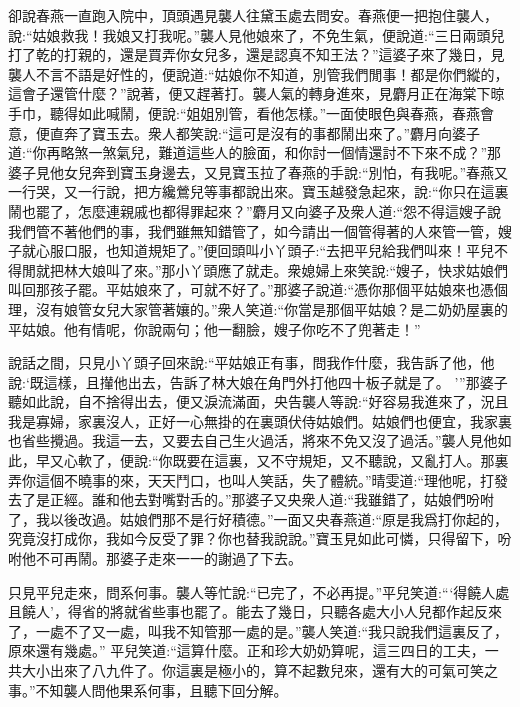 \begin{parag}
    卻說春燕一直跑入院中，頂頭遇見襲人往黛玉處去問安。春燕便一把抱住襲人，說:“姑娘救我！我娘又打我呢。”襲人見他娘來了，不免生氣，便說道:“三日兩頭兒打了乾的打親的，還是買弄你女兒多，還是認真不知王法？”這婆子來了幾日，見襲人不言不語是好性的，便說道:“姑娘你不知道，別管我們閒事！都是你們縱的，這會子還管什麼？”說著，便又趕著打。襲人氣的轉身進來，見麝月正在海棠下晾手巾，聽得如此喊鬧，便說:“姐姐別管，看他怎樣。”一面使眼色與春燕，春燕會意，便直奔了寶玉去。衆人都笑說:“這可是沒有的事都鬧出來了。”麝月向婆子道:“你再略煞一煞氣兒，難道這些人的臉面，和你討一個情還討不下來不成？”那婆子見他女兒奔到寶玉身邊去，又見寶玉拉了春燕的手說:“別怕，有我呢。”春燕又一行哭，又一行說，把方纔鶯兒等事都說出來。寶玉越發急起來，說:“你只在這裏鬧也罷了，怎麼連親戚也都得罪起來？”麝月又向婆子及衆人道:“怨不得這嫂子說我們管不著他們的事，我們雖無知錯管了，如今請出一個管得著的人來管一管，嫂子就心服口服，也知道規矩了。”便回頭叫小丫頭子:“去把平兒給我們叫來！平兒不得閒就把林大娘叫了來。”那小丫頭應了就走。衆媳婦上來笑說:“嫂子，快求姑娘們叫回那孩子罷。平姑娘來了，可就不好了。”那婆子說道:“憑你那個平姑娘來也憑個理，沒有娘管女兒大家管著孃的。”衆人笑道:“你當是那個平姑娘？是二奶奶屋裏的平姑娘。他有情呢，你說兩句；他一翻臉，嫂子你吃不了兜著走！”
\end{parag}


\begin{parag}
    說話之間，只見小丫頭子回來說:“平姑娘正有事，問我作什麼，我告訴了他，他說:‘既這樣，且攆他出去，告訴了林大娘在角門外打他四十板子就是了。 ’”那婆子聽如此說，自不捨得出去，便又淚流滿面，央告襲人等說:“好容易我進來了，況且我是寡婦，家裏沒人，正好一心無掛的在裏頭伏侍姑娘們。姑娘們也便宜，我家裏也省些攪過。我這一去，又要去自己生火過活，將來不免又沒了過活。”襲人見他如此，早又心軟了，便說:“你既要在這裏，又不守規矩，又不聽說，又亂打人。那裏弄你這個不曉事的來，天天鬥口，也叫人笑話，失了體統。”晴雯道:“理他呢，打發去了是正經。誰和他去對嘴對舌的。”那婆子又央衆人道:“我雖錯了，姑娘們吩咐了，我以後改過。姑娘們那不是行好積德。”一面又央春燕道:“原是我爲打你起的，究竟沒打成你，我如今反受了罪？你也替我說說。”寶玉見如此可憐，只得留下，吩咐他不可再鬧。那婆子走來一一的謝過了下去。
\end{parag}


\begin{parag}
    只見平兒走來，問系何事。襲人等忙說:“已完了，不必再提。”平兒笑道:“‘得饒人處且饒人’，得省的將就省些事也罷了。能去了幾日，只聽各處大小人兒都作起反來了，一處不了又一處，叫我不知管那一處的是。”襲人笑道:“我只說我們這裏反了，原來還有幾處。” 平兒笑道:“這算什麼。正和珍大奶奶算呢，這三四日的工夫，一共大小出來了八九件了。你這裏是極小的，算不起數兒來，還有大的可氣可笑之事。”不知襲人問他果系何事，且聽下回分解。
\end{parag}
